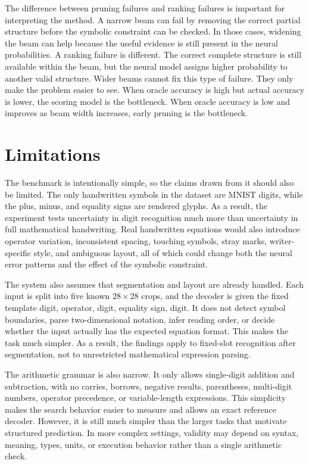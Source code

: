 \documentclass[12pt]{article}
\begin{document}
The difference between pruning failures and ranking failures is important for interpreting the method. A narrow beam can fail by removing the correct partial structure before the symbolic constraint can be checked. In those cases, widening the beam can help because the useful evidence is still present in the neural probabilities. A ranking failure is different. The correct complete structure is still available within the beam, but the neural model assigns higher probability to another valid structure. Wider beams cannot fix this type of failure. They only make the problem easier to see. When oracle accuracy is high but actual accuracy is lower, the scoring model is the bottleneck. When oracle accuracy is low and improves as beam width increases, early pruning is the bottleneck.

\section{Limitations}
The benchmark is intentionally simple, so the claims drawn from it should also be limited. The only handwritten symbols in the dataset are MNIST digits, while the plus, minus, and equality signs are rendered glyphs. As a result, the experiment tests uncertainty in digit recognition much more than uncertainty in full mathematical handwriting. Real handwritten equations would also introduce operator variation, inconsistent spacing, touching symbols, stray marks, writer-specific style, and ambiguous layout, all of which could change both the neural error patterns and the effect of the symbolic constraint.

The system also assumes that segmentation and layout are already handled. Each input is split into five known $28 \times 28$ crops, and the decoder is given the fixed template digit, operator, digit, equality sign, digit. It does not detect symbol boundaries, parse two-dimensional notation, infer reading order, or decide whether the input actually has the expected equation format. This makes the task much simpler. As a result, the findings apply to fixed-slot recognition after segmentation, not to unrestricted mathematical expression parsing.

The arithmetic grammar is also narrow. It only allows single-digit addition and subtraction, with no carries, borrows, negative results, parentheses, multi-digit numbers, operator precedence, or variable-length expressions. This simplicity makes the search behavior easier to measure and allows an exact reference decoder. However, it is still much simpler than the larger tasks that motivate structured prediction. In more complex settings, validity may depend on syntax, meaning, types, units, or execution behavior rather than a single arithmetic check.
\end{document}
